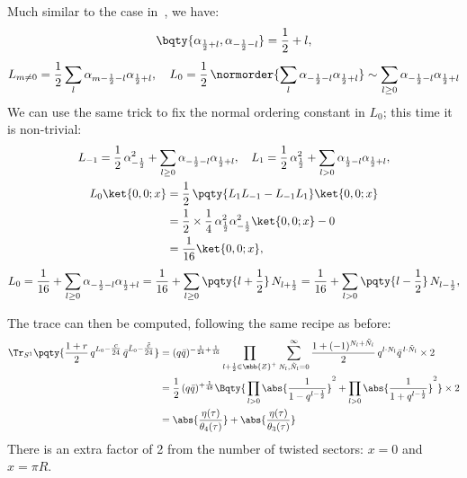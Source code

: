 \documentclass[a4paper,10pt]{article}
\begin{document}
\begin{enumerate}
\begin{enumerate}
	Much similar to the case in \,, we have:
	\begin{gather}
		\bqty{
			\alpha_{\frac{1}{2} + l},
			\alpha_{- \frac{1}{2} - l}
		} = \frac{1}{2} + l,\\[1ex]
		L_{m\ne 0}
		= \frac{1}{2}
			\sum_l \alpha_{m - \frac{1}{2} - l}
					\alpha_{\frac{1}{2} + l},\quad
		L_0 = \frac{1}{2}\,\normorder{
			\sum_l \alpha_{-\frac{1}{2}-l}
					\alpha_{\frac{1}{2}+l}
		}
		\sim \sum_{l \ge 0}
				\alpha_{-\frac{1}{2}-l}
				\alpha_{\frac{1}{2}+l}
	\end{gather}
	We can use the same trick to fix the normal ordering constant in $L_0$; this time it is non-trivial:
	\begin{gather}
		L_{-1} = \frac{1}{2}\,
				\alpha_{-\frac{1}{2}}^2
			+ \sum_{l \ge 0}
				\alpha_{-\frac{1}{2}-l}
				\alpha_{\frac{1}{2}+l},\quad
		L_1 = \frac{1}{2}\,
				\alpha_{\frac{1}{2}}^2
			+ \sum_{l > 0}
				\alpha_{\frac{1}{2}-l}
				\alpha_{\frac{1}{2}+l}, \\
	\begin{aligned}
		L_0 \ket{0,0;x}
		&= \frac{1}{2}\,\pqty{
				L_1 L_{-1} - L_{-1} L_1
			} \ket{0,0;x} \\
		&= \frac{1}{2}\times \frac{1}{4}\,
				\alpha_{\frac{1}{2}}^2
				\alpha_{-\frac{1}{2}}^2
			\ket{0,0;x} - 0 \\
		&= \frac{1}{16} \ket{0,0;x},
	\end{aligned}
	\\[1ex]
		L_0
		= \frac{1}{16}
			+ \sum_{l \ge 0}
				\alpha_{-\frac{1}{2}-l}
				\alpha_{\frac{1}{2}+l}
		= \frac{1}{16}
			+ \sum_{l \ge 0}
				\pqty{l + \frac{1}{2}}\,
				N_{l + \frac{1}{2}}
		= \frac{1}{16}
			+ \sum_{l > 0}
				\pqty{l - \frac{1}{2}}\,
				N_{l - \frac{1}{2}},
	\end{gather}
	
	The trace can then be computed, following the same recipe as before:
	\begin{equation}
	\begin{aligned}
		\Tr_{S^1} \pqty{
			\frac{1 + r}{2}\,
			q^{L_0 - \tfrac{c}{24}}\,
			\bar{q}^{\tilde{L}_0 - \tfrac{\tilde{c}}{24}}
		}
		&= (q\bar{q})^{
				-\frac{1}{24} + \frac{1}{16}
			}
			\prod_{l + \frac{1}{2} \in \mbb{Z}^+}
			\sum_{N_l,\tilde{N}_l = 0}^\infty
				\frac{1 + (-1)^{N_l + \tilde{N}_l}}{2}\,
				q^{l\cdot N_l}
				\bar{q}^{\,l\cdot \tilde{N}_l} \times 2 \\
		&= \frac{1}{2}\,(q\bar{q})^{+\frac{1}{48}}
		\Bqty{\,
			\prod_{l>0}
				\abs{\frac{1}{1 - q^{l - \frac{1}{2}}}}^2
			+ \prod_{l>0}
				\abs{\frac{1}{1 + q^{l - \frac{1}{2}}}}^2
		}\times 2 \\
		&= \abs{\frac{\eta(\tau)}{\theta_4(\tau)}}
			+ \abs{\frac{\eta(\tau)}{\theta_3(\tau)}}
	\end{aligned}
	\end{equation}
	There is an extra factor of 2 from the number of twisted sectors: $x = 0$ and $x = \pi R$. 
	

\end{enumerate}
\end{enumerate}
\end{document}
